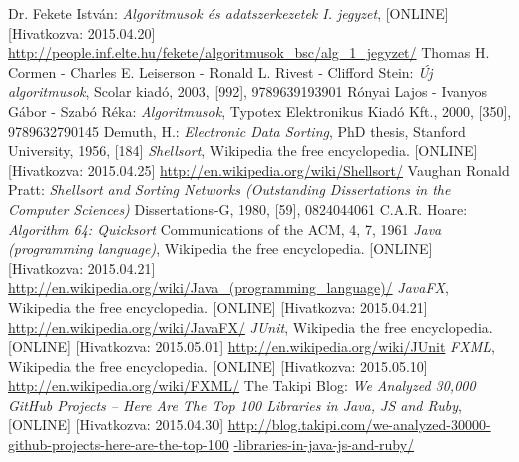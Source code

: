 \documentclass{elteikthesis}
\begin{document}
\begin{thebibliography}{widest entry}
Dr. Fekete István:
\emph{Algoritmusok és adatszerkezetek I. jegyzet},
[ONLINE] [Hivatkozva: 2015.04.20] \url{http://people.inf.elte.hu/fekete/algoritmusok_bsc/alg_1_jegyzet/}
Thomas H. Cormen - Charles E. Leiserson - Ronald L. Rivest - Clifford Stein:
\emph{Új algoritmusok},
Scolar kiadó, 2003,
[992], 9789639193901
Rónyai Lajos - Ivanyos Gábor - Szabó Réka:
\emph{Algoritmusok},
Typotex Elektronikus Kiadó Kft., 2000,
[350], 9789632790145
Demuth, H.:
\emph{Electronic Data Sorting},
PhD thesis, Stanford University,
1956, [184]
\emph{Shellsort},
Wikipedia the free encyclopedia.
[ONLINE] [Hivatkozva: 2015.04.25]
\url{http://en.wikipedia.org/wiki/Shellsort/}
Vaughan Ronald Pratt:
\emph{Shellsort and Sorting Networks (Outstanding Dissertations in the Computer Sciences)}
Dissertations-G, 1980,
[59], 0824044061
C.A.R. Hoare:
\emph{Algorithm 64: Quicksort}
Communications of the ACM, 4, 7, 1961
\emph{Java (programming language)},
Wikipedia the free encyclopedia.
[ONLINE] [Hivatkozva: 2015.04.21]
\url{http://en.wikipedia.org/wiki/Java_(programming_language)/}
\emph{JavaFX},
Wikipedia the free encyclopedia.
[ONLINE] [Hivatkozva: 2015.04.21]
\url{http://en.wikipedia.org/wiki/JavaFX/}
\emph{JUnit},
Wikipedia the free encyclopedia.
[ONLINE] [Hivatkozva: 2015.05.01]
\url{http://en.wikipedia.org/wiki/JUnit}
\emph{FXML},
Wikipedia the free encyclopedia.
[ONLINE] [Hivatkozva: 2015.05.10]
\url{http://en.wikipedia.org/wiki/FXML/}
The Takipi Blog:
\emph{We Analyzed 30,000 GitHub Projects – Here Are The Top 100 Libraries in Java, JS and Ruby},
[ONLINE] [Hivatkozva: 2015.04.30] \url{http://blog.takipi.com/we-analyzed-30000-github-projects-here-are-the-top-100}
\url{-libraries-in-java-js-and-ruby/}
\end{thebibliography}
\end{document}
